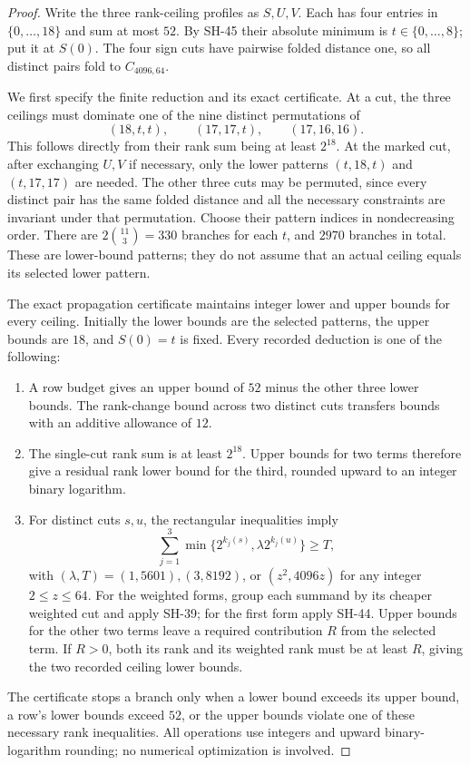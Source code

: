 \begin{proof}
Write the three rank-ceiling profiles as $S,U,V$.
Each has four entries in $\{0,\ldots,18\}$ and
sum at most $52$.  By SH-45 their absolute minimum
is $t\in\{0,\ldots,8\}$; put it at $S(0)$.
The four sign cuts have pairwise folded distance
one, so all distinct pairs fold to $C_{4096,64}$.

We first specify the finite reduction and its exact
certificate.  At a cut, the three ceilings must
dominate one of the nine distinct permutations of
\[
 (18,t,t),\qquad(17,17,t),\qquad(17,16,16).
                                                        \tag{SH-46.1}
\]
This follows directly from their rank sum being at
least $2^{18}$.  At the marked cut, after exchanging
$U,V$ if necessary, only the lower patterns
$(t,18,t)$ and $(t,17,17)$ are needed.
The other three cuts may be permuted, since every
distinct pair has the same folded distance and all
the necessary constraints are invariant under that
permutation.  Choose their pattern indices in
nondecreasing order.  There are
$2\binom{11}{3}=330$ branches for each $t$, and
$2970$ branches in total.  These are lower-bound
patterns; they do not assume that an actual ceiling
equals its selected lower pattern.

The exact propagation certificate maintains integer
lower and upper bounds for every ceiling.  Initially
the lower bounds are the selected patterns, the
upper bounds are $18$, and $S(0)=t$ is fixed.
Every recorded deduction is one of the following:
\begin{enumerate}
\item A row budget gives an upper bound of $52$
minus the other three lower bounds.  The rank-change
bound across two distinct cuts transfers bounds
with an additive allowance of $12$.
\item The single-cut rank sum is at least $2^{18}$.
Upper bounds for two terms therefore give a residual
rank lower bound for the third, rounded upward to
an integer binary logarithm.
\item For distinct cuts $s,u$, the rectangular
inequalities imply
\[
 \sum_{j=1}^3\min\{2^{k_j(s)},\lambda2^{k_j(u)}\}
 \ge T,                                           \tag{SH-46.2}
\]
with $(\lambda,T)=(1,5601),(3,8192)$, or
$(z^2,4096z)$ for any integer $2\le z\le64$.
For the weighted forms, group each summand by its
cheaper weighted cut and apply SH-39; for the
first form apply SH-44.  Upper bounds for the
other two terms leave a required contribution
$R$ from the selected term.  If $R>0$, both its
rank and its weighted rank must be at least $R$,
giving the two recorded ceiling lower bounds.
\end{enumerate}
The certificate stops a branch only when a lower
bound exceeds its upper bound, a row's lower
bounds exceed $52$, or the upper bounds violate
one of these necessary rank inequalities.  All
operations use integers and upward binary-logarithm
rounding; no numerical optimization is involved.


\end{proof}
